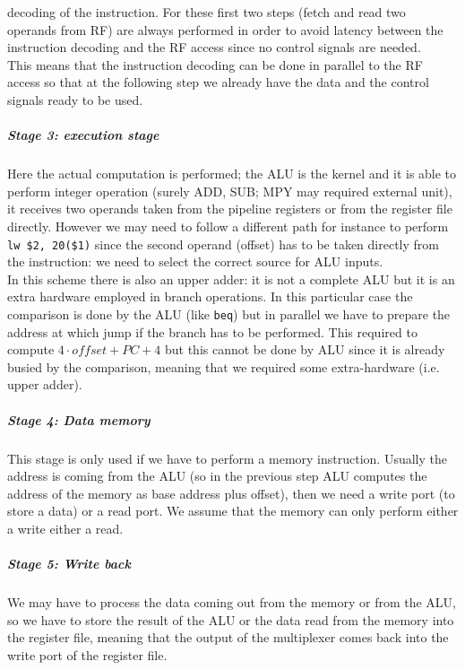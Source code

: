 decoding of the instruction. For these first two steps (fetch and read two
operands from RF) are always performed in order to avoid latency between the
instruction decoding and the RF access since no control signals are needed.\\
This means that the instruction decoding can be done in parallel to the RF
access so that at the following step we already have the data and the control
signals ready to be used.
\subparagraph{Stage 3: execution stage}
Here the actual computation is performed; the ALU is the kernel and it is able
to perform integer operation (surely ADD, SUB; MPY may required external unit),
it receives two operands taken from the pipeline registers or from the register
file directly. However we may need to follow a different path for instance to
perform \verb|lw $2, 20($1)| since the second operand (offset) has to be taken
directly from the instruction: we need to select the correct source for ALU
inputs.\\
In this scheme there is also an upper adder: it is not a complete ALU but it is
an extra hardware employed in branch operations. In this particular case the
comparison is done by the ALU (like \verb|beq|) but in parallel we have to
prepare the address at which jump if the branch has to be performed. This
required to compute $4 \cdot offset + PC+4$ but this cannot be done by ALU
since it is already busied by the comparison, meaning that we required some
extra-hardware (i.e. upper adder).
\subparagraph{Stage 4: Data memory}
This stage is only used if we have to perform a memory instruction. Usually the
address is coming from the ALU (so in the previous step ALU computes the address
of the memory as base address plus offset), then we need a write port (to store
a data) or a read port. We assume that the memory can only perform either a
write either a read.
\subparagraph{Stage 5: Write back}
We may have to process the data coming out from the memory or from the ALU, so
we have to store the result of the ALU or the data read from the memory into the
register file, meaning that the output of the multiplexer comes back into the
write port of the register file.
